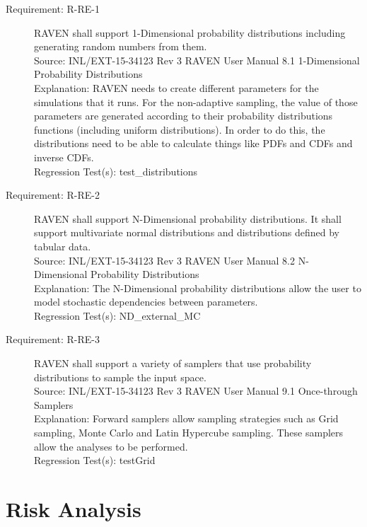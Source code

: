 \documentclass{article}
\newcommand{\requirement}[5]{\item[Requirement: #1] #2 \\Source: #3\\Explanation: #4\\Regression Test(s): #5}
\begin{document}
\begin{description}

\requirement{R-RE-1}{RAVEN shall support 1-Dimensional probability distributions including generating random numbers from them.}
{INL/EXT-15-34123 Rev 3 RAVEN User Manual 8.1 1-Dimensional Probability Distributions}
{RAVEN needs to create different parameters for the simulations that it runs.  For the non-adaptive sampling, the value of those parameters are generated according to their probability distributions functions (including uniform distributions).  In order to do this, the distributions need to be able to calculate things like PDFs and CDFs and inverse CDFs.}
{test\_distributions}

\requirement{R-RE-2}{RAVEN shall support N-Dimensional probability distributions.  It shall support multivariate normal distributions and distributions defined by tabular data.}
{INL/EXT-15-34123 Rev 3 RAVEN User Manual 8.2 N-Dimensional Probability Distributions}
{The N-Dimensional probability distributions allow the user to model stochastic dependencies between parameters.}
{ND\_external\_MC}

\requirement{R-RE-3}{RAVEN shall support a variety of samplers that use probability distributions to sample the input space.}
{INL/EXT-15-34123 Rev 3 RAVEN User Manual 9.1 Once-through Samplers}
{Forward samplers allow sampling strategies such as Grid sampling, Monte Carlo and Latin Hypercube sampling.  These samplers allow the analyses to be performed.}
{testGrid}

\end{description}

\section{Risk Analysis}
\end{document}
